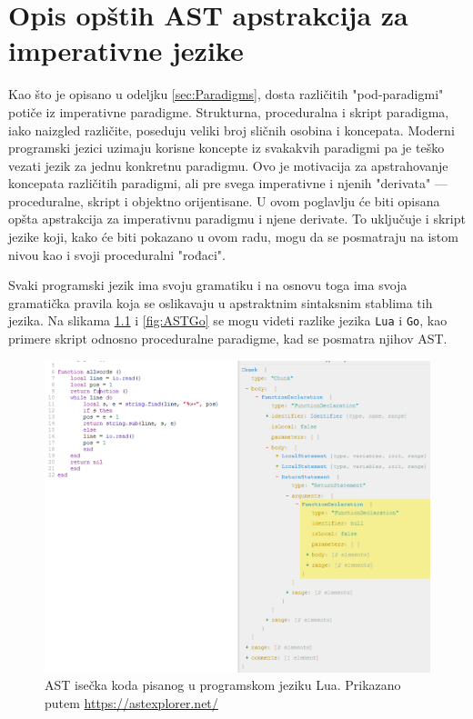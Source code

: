 \chapter{Opis opštih AST apstrakcija za imperativne jezike}
\label{chp:MyAST}

Kao što je opisano u odeljku \ref{sec:Paradigms}, dosta različitih "pod-paradigmi" potiče iz imperativne paradigme. Strukturna, proceduralna i skript paradigma, iako naizgled različite, poseduju veliki broj sličnih osobina i koncepata. Moderni programski jezici uzimaju korisne koncepte iz svakakvih paradigmi pa je teško vezati jezik za jednu konkretnu paradigmu. Ovo je motivacija za apstrahovanje koncepata različitih paradigmi, ali pre svega imperativne i njenih "derivata" --- proceduralne, skript i objektno orijentisane. U ovom poglavlju će biti opisana opšta apstrakcija za imperativnu paradigmu i njene derivate. To uključuje i skript jezike koji, kako će biti pokazano u ovom radu, mogu da se posmatraju na istom nivou kao i svoji proceduralni "rođaci".

Svaki programski jezik ima svoju gramatiku i na osnovu toga ima svoja gramatička pravila koja se oslikavaju u apstraktnim sintaksnim stablima tih jezika. Na slikama \ref{fig:ASTLua} i \ref{fig:ASTGo} se mogu videti razlike jezika \texttt{Lua} i \texttt{Go}, kao primere skript odnosno proceduralne paradigme, kad se posmatra njihov AST.

\begin{figure}[h!]
\centering
\includegraphics[scale=0.6]{images/ast_lua.png}
\caption{AST isečka koda pisanog u programskom jeziku Lua. Prikazano putem \url{https://astexplorer.net/}}
\label{fig:ASTLua}
\end{figure}

